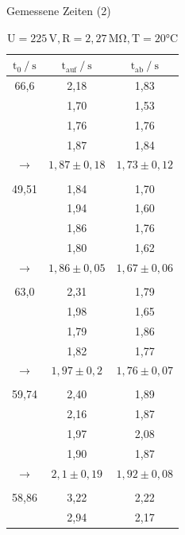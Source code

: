 \begin{table} [H]
    \caption{Gemessene Zeiten (2)}
    \label{Tabelle6}
    \begin{subtable}[c]{0.5\textwidth}
        \centering
        \caption{$\text{U} = 225\,\text{V}, \text{R} = 2,27\,\unit{\mega\ohm}, \text{T} = 20\unit{\celsius}  $}
        \begin{tabular}{ c | c | c}
            \toprule
            {$\text{t}_{0} \mathbin{/}\unit{\second} $}&
            {$\text{t}_{\text{auf}} \mathbin{/}\unit{\second} $}&
            {$\text{t}_{\text{ab}} \mathbin{/}\unit{\second} $}\\
            \midrule
            66,6 & 2,18 & 1,83 \\
            & 1,70 & 1,53 \\
            & 1,76 & 1,76 \\
            & 1,87 & 1,84 \\
            \rowcolor{gray}$\to$ & $ 1,87 \pm 0,18 $ & $ 1,73 \pm 0,12 $ \\
            &  &  \\
            49,51 & 1,84 & 1,70 \\
            & 1,94 & 1,60 \\
            & 1,86 & 1,76 \\
            & 1,80 & 1,62 \\
            \rowcolor{gray}$\to$ & $ 1,86 \pm 0,05 $ & $ 1,67 \pm 0,06 $ \\
            &  &  \\
            63,0 & 2,31 & 1,79 \\
            & 1,98 & 1,65 \\
            & 1,79 & 1,86 \\
            & 1,82 & 1,77 \\
            \rowcolor{gray}$\to$ & $ 1,97 \pm 0,2 $ & $ 1,76 \pm 0,07 $ \\
            &  &  \\
            59,74 & 2,40 & 1,89 \\
            & 2,16 & 1,87 \\
            & 1,97 & 2,08 \\
            & 1,90 & 1,87 \\
            \rowcolor{gray}$\to$ & $ 2,1 \pm 0,19 $ & $ 1,92 \pm 0,08 $ \\
            &  &  \\
            58,86 & 3,22 & 2,22 \\
            & 2,94 & 2,17 \\

\end{tabular}
\end{subtable}
\end{table}
